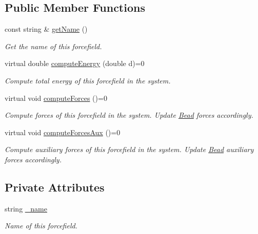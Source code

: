 \subsection*{Public Member Functions}
\begin{DoxyCompactItemize}
\item 
const string \& \hyperlink{classForceField_a4a09e09603b4c4650dc7b3b0f0912fd2}{get\+Name} ()
\begin{DoxyCompactList}\small\item\em Get the name of this forcefield. \end{DoxyCompactList}\item 
virtual double \hyperlink{classForceField_a9bed91c670fe33dfc82da2b357fb8fa6}{compute\+Energy} (double d)=0
\begin{DoxyCompactList}\small\item\em Compute total energy of this forcefield in the system. \end{DoxyCompactList}\item 
virtual void \hyperlink{classForceField_a56c33a25830131e45068454de039513a}{compute\+Forces} ()=0
\begin{DoxyCompactList}\small\item\em Compute forces of this forcefield in the system. Update \hyperlink{classBead}{Bead} forces accordingly. \end{DoxyCompactList}\item 
virtual void \hyperlink{classForceField_a17004f440c9d380da5b9d9ea8794b3cc}{compute\+Forces\+Aux} ()=0
\begin{DoxyCompactList}\small\item\em Compute auxiliary forces of this forcefield in the system. Update \hyperlink{classBead}{Bead} auxiliary forces accordingly. \end{DoxyCompactList}\end{DoxyCompactItemize}
\subsection*{Private Attributes}
\begin{DoxyCompactItemize}
\item 
string \hyperlink{classForceField_a3d11aed54fdc916c9a0f50c19294c3aa}{\+\_\+name}
\begin{DoxyCompactList}\small\item\em Name of this forcefield. \end{DoxyCompactList}\end{DoxyCompactItemize}


